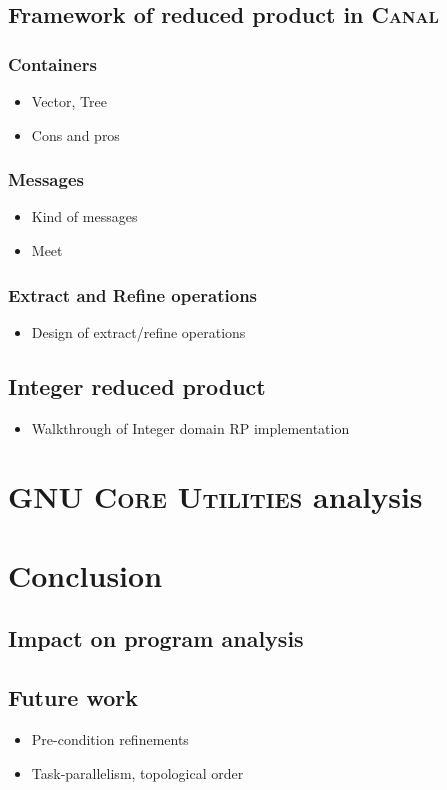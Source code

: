 \documentclass[12pt,oneside]{fithesis2}
\theoremstyle{definition}
\begin{document}
\section{Framework of reduced product in \textsc{Canal}}

\subsection{Containers}
\begin{itemize}
  \item Vector, Tree
  \item Cons and pros
\end{itemize}

\subsection{Messages}
\begin{itemize}
  \item Kind of messages
  \item Meet
\end{itemize}

\subsection{Extract and Refine operations}
\begin{itemize}
  \item Design of extract/refine operations
\end{itemize}

\section{Integer reduced product}
\begin{itemize}
  \item Walkthrough of Integer domain RP implementation
\end{itemize}

\chapter{\textsc{GNU Core Utilities} analysis}

\chapter{Conclusion}
\section{Impact on program analysis}
\section{Future work}
\begin{itemize}
  \item Pre-condition refinements
  \item Task-parallelism, topological order
\end{itemize}



\end{document}
